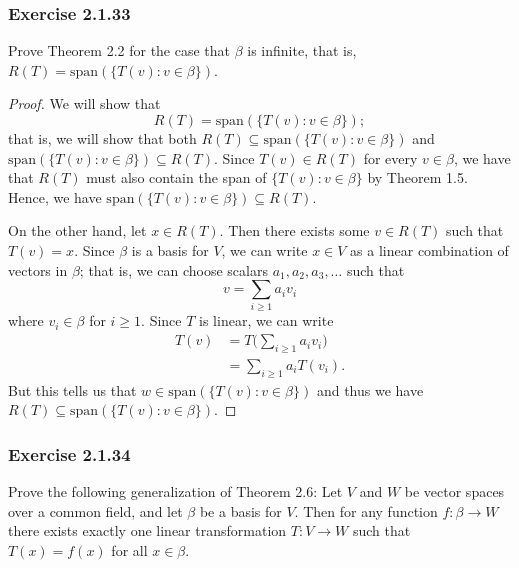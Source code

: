 \subsubsection{Exercise 2.1.33} Prove Theorem 2.2 for the case that \( \beta  \) is infinite, that is, \( R(T) = \text{span}(\{ T(v) : v \in \beta  \} ) \).
\begin{proof}
    We will show that 
    \[ R(T) = \text{span}(\{ T(v) : v \in \beta \} );  \]
    that is, we will show that both \( R(T) \subseteq \text{span}(\{ T(v) : v \in \beta  \} )  \) and \( \text{span}(\{ T(v) : v \in \beta  \} ) \subseteq R(T)\). Since \( T(v) \in R(T)   \) for every \( v \in \beta  \), we have that \( R(T) \) must also contain the span of \( \{ T(v) : v \in \beta  \}   \) by Theorem 1.5. Hence, we have \( \text{span}(\{ T(v) : v \in \beta  \} ) \subseteq R(T)  \).

    On the other hand, let \( x \in R(T) \). Then there exists some \( v \in R(T) \) such that \( T(v) = x  \). Since \( \beta  \) is a basis for \( V  \), we can write \( x \in V   \) as a linear combination of vectors in \( \beta  \); that is, we can choose scalars \( {a}_{1}, {a}_{2}, {a}_{3}, \dots   \) such that 
    \[  v = \sum_{i \geq 1} {a}_{i} {v}_{i}   \]
    where \( {v}_{i} \in \beta  \) for \( i \geq 1 \). Since \( T  \) is linear, we can write
   \begin{align*}
       T(v) &= T \Big(  \sum_{ i \geq 1  }^{  } {a}_{i} {v}_{i}  \Big) \\
            &=  \sum_{ i \geq 1  }^{  } {a}_{i} T({v}_{i}). 
   \end{align*} 
   But this tells us that \( w \in \text{span}(\{ T(v) : v \in \beta \} ) \) and thus we have  \( R(T) \subseteq \text{span}(\{ T(v) : v \in \beta  \} ) \).
\end{proof}

\subsubsection{Exercise 2.1.34} Prove the following generalization of Theorem 2.6: Let \( V  \) and \( W  \) be vector spaces over a common field, and let \( \beta  \) be a basis for \( V  \). Then for any function \( f: \beta \to W  \) there exists exactly one linear transformation \( T: V \to W  \) such that \( T(x) = f(x)  \) for all \( x \in \beta  \).

